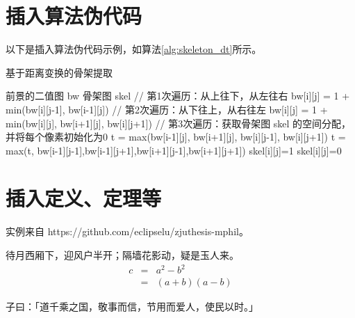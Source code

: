 



\section{插入算法伪代码}
以下是插入算法伪代码示例，如算法\ref{alg:skeleton_dt}所示。

\begin{algorithm}[!htb]
\caption{基于距离变换的骨架提取}
\label{alg:skeleton_dt}
\begin{algorithmic}[1]
\Require 前景的二值图 bw  
\Ensure 骨架图 skel
\State // 第1次遍历：从上往下，从左往右
 
     
        \State bw[i][j] = 1 + min(bw[i][j-1], bw[i-1][j])   
    \EndFor
\EndFor
\State // 第2次遍历：从下往上，从右往左
        \State bw[i][j] = 1 + min(bw[i][j], bw[i+1][j], bw[i][j+1])
    \EndFor
\EndFor
\State // 第3次遍历：获取骨架图
\State skel 的空间分配，并将每个像素初始化为0
        \State t = max(bw[i-1][j], bw[i+1][j], bw[i][j-1], bw[i][j+1])   
        \State t = max(t, bw[i-1][j-1],bw[i-1][j+1],bw[i+1][j-1],bw[i+1][j+1])
        	\State skel[i][j]=1  
        \Else 
        	\State skel[i][j]=0
        \EndIf
    \EndFor
\EndFor
\end{algorithmic}
\end{algorithm}

\section{插入定义、定理等}
实例来自 https://github.com/eclipselu/zjuthesis-mphil。

\begin{hypo}
待月西厢下，迎风户半开；隔墙花影动，疑是玉人来。
\begin{eqnarray}
  \label{eq:eqnxmp}
  c & = & a^2 - b^2\\
    & = & (a+b)(a-b)
\end{eqnarray}
\end{hypo}

\begin{defin}
子曰：「道千乘之国，敬事而信，节用而爱人，使民以时。」
\end{defin}


